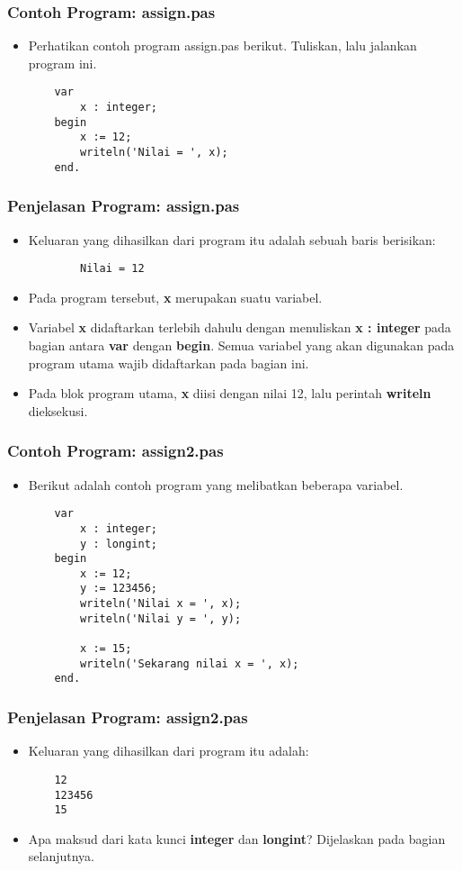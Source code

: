 \documentclass{beamer}
\begin{document}
\begin{frame}[fragile]
\frametitle{Contoh Program: assign.pas}
\begin{itemize}
	\item Perhatikan contoh program assign.pas berikut. Tuliskan, lalu jalankan program ini.
	\begin{lstlisting}
	var
	    x : integer;
	begin
	    x := 12;
	    writeln('Nilai = ', x);
	end.
	\end{lstlisting}
\end{itemize}
\end{frame}

\begin{frame}[fragile]
\frametitle{Penjelasan Program: assign.pas}
\begin{itemize}
	\item Keluaran yang dihasilkan dari program itu adalah sebuah baris berisikan:
	\begin{lstlisting}
		Nilai = 12
	\end{lstlisting}
	\item Pada program tersebut, \textbf{x} merupakan suatu variabel.
	\item Variabel \textbf{x} didaftarkan terlebih dahulu dengan menuliskan \textbf{x : integer} pada bagian antara \textbf{var} dengan \textbf{begin}. Semua variabel yang akan digunakan pada program utama wajib didaftarkan pada bagian ini.
	\item Pada blok program utama, \textbf{x} diisi dengan nilai 12, lalu perintah \textbf{writeln} dieksekusi.
\end{itemize}
\end{frame}

\begin{frame}[fragile]
\frametitle{Contoh Program: assign2.pas}
\begin{itemize}
	\item Berikut adalah contoh program yang melibatkan beberapa variabel.
	\begin{lstlisting}
	var
	    x : integer;
	    y : longint;
	begin
	    x := 12;
	    y := 123456;
	    writeln('Nilai x = ', x);
	    writeln('Nilai y = ', y);
	    
	    x := 15;
	    writeln('Sekarang nilai x = ', x);
	end.
	\end{lstlisting}
\end{itemize}
\end{frame}

\begin{frame}[fragile]
\frametitle{Penjelasan Program: assign2.pas}
\begin{itemize}
	\item Keluaran yang dihasilkan dari program itu adalah:
	\begin{lstlisting}
	12
	123456
	15
	\end{lstlisting}
	\item Apa maksud dari kata kunci \textbf{integer} dan \textbf{longint}? Dijelaskan pada bagian selanjutnya.
\end{itemize}
\end{frame}
\end{document}
